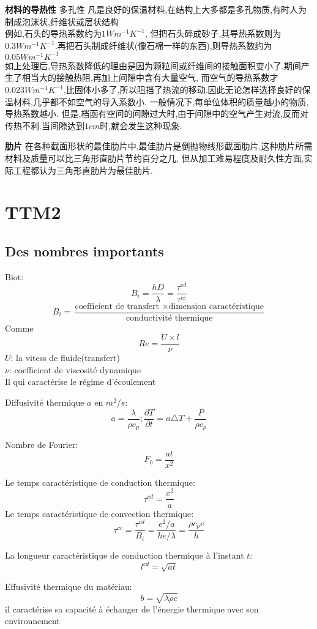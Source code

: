 \documentclass{article}
\begin{document}
\textbf{材料的导热性}
多孔性 凡是良好的保温材料,在结构上大多都是多孔物质,有时人为制成泡沫状,纤维状或层状结构 \\
例如,石头的导热系数约为$1Wm^{-1}K^{-1}$, 但把石头碎成砂子,其导热系数则为$0.3Wm^{-1}K^{-1}$.再把石头制成纤维状(像石棉一样的东西),则导热系数约为$0.05Wm^{-1}K^{-1}$ \\
如上处理后,导热系数降低的理由是因为颗粒间或纤维间的接触面积变小了,期间产生了相当大的接触热阻,再加上间隙中含有大量空气,
而空气的导热系数才$0.023Wm^{-1}K^{-1}$,比固体小多了,所以阻挡了热流的移动.因此无论怎样选择良好的保温材料,几乎都不如空气的导入系数小.
一般情况下,每单位体积的质量越小的物质,导热系数越小. 但是,档函有空间的间隙过大时,由于间隙中的空气产生对流,反而对传热不利.当间隙达到$1cm$时,就会发生这种现象.

\textbf{肋片}
在各种截面形状的最佳肋片中,最佳肋片是倒抛物线形截面肋片,这种肋片所需材料及质量可以比三角形直肋片节约百分之几,
但从加工难易程度及耐久性方面,实际工程都认为三角形直肋片为最佳肋片.

\section{TTM2}
\subsection{Des nombres importants}
Biot:$$B_i = \frac{ hD}{\lambda }=\frac{\tau^{cd}}{\tau^{cc}}$$
$$B_i = \frac{ \text{coefficient de transfert } \times \text{dimension caract\'eristique} }{\text{conductivit\'e thermique}}$$
Comme $$Re=\frac{U\times l}{\nu}$$
$U$: la vitess de fluide(transfert)\\
$\nu$: coefficient de viscosit\'e dynamique\\
Il qui caract\'erise le r\'egime d'\'ecoulement

Diffusivit\'e thermique $a$ en $m^2/s$:$$a=\frac{\lambda }{\rho c_p};\frac{\partial T}{\partial t}=a\triangle T + \frac{P}{\rho c_p}$$

Nombre de Fourier:$$F_0=\frac{ at}{x^2}$$

Le temps caract\'eristique de conduction thermique:$$\tau^{cd}=\frac{x^2}{a}$$
Le temps caract\'eristique de convection thermique:$$\tau^{cc}=\frac{\tau^{cd}}{B_i}=\frac{e^2/a }{he/\lambda }=\frac{\rho c_p e}{h}$$

La longueur caract\'eristique de conduction thermique \`a l'instant $t$:$$l^{cd}=\sqrt{at}$$

Effusivit\'e thermique du mat\'eriau:$$b=\sqrt{\lambda \rho c}$$
il caract\'erise sa capacit\'e \`a \'echanger de l'\'energie thermique avec son environnement\\
\end{document}

